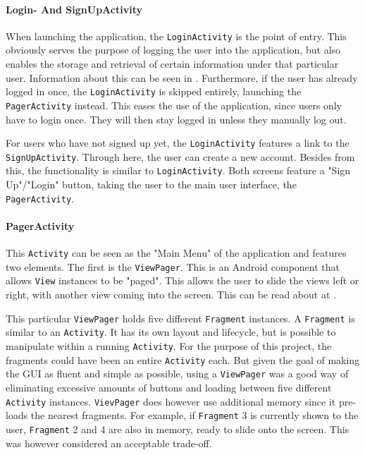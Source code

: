 \paragraph{Login- And SignUpActivity}
When launching the application, the \texttt{LoginActivity} is the point of entry. This obviously serves the purpose of logging the user into the application, but also enables the storage and retrieval of certain information under that particular user. Information about this can be seen in . Furthermore, if the user has already logged in once, the \texttt{LoginActivity} is skipped entirely, launching the \texttt{PagerActivity} instead. This eases the use of the application, since users only have to login once. They will then stay logged in unless they manually log out.

For users who have not signed up yet, the \texttt{LoginActivity} features a link to the \texttt{SignUpActivity}. Through here, the user can create a new account. Besides from this, the functionality is similar to \texttt{LoginActivity}. Both screens feature a "Sign Up"/"Login" button, taking the user to the main user interface, the \texttt{PagerActivity}.

\paragraph{PagerActivity}
This \texttt{Activity} can be seen as the "Main Menu" of the application and features two elements. The first is the \texttt{ViewPager}. This is an Android component that allows \texttt{View} instances to be "paged". This allows the user to slide the views left or right, with another view coming into the screen. This can be read about at \citep{viewpager}.

This particular \texttt{ViewPager} holds five different \texttt{Fragment} instances. A \texttt{Fragment} is similar to an \texttt{Activity}. It has its own layout and lifecycle, but is possible to manipulate within a running \texttt{Activity}.\citep{fragment} For the purpose of this project, the fragments could have been an entire \texttt{Activity} each. But given the goal of making the GUI as fluent and simple as possible, using a \texttt{ViewPager} was a good way of eliminating excessive amounts of buttons and loading between five different \texttt{Activity} instances. \texttt{VievPager} does however use additional memory since it pre-loads the nearest fragments. For example, if \texttt{Fragment} 3 is currently shown to the user, \texttt{Fragment} 2 and 4 are also in memory, ready to slide onto the screen. This was however considered an acceptable trade-off.

